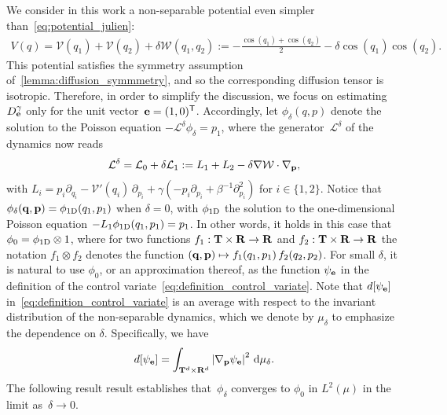 \documentclass[11pt,a4paper]{article}
\begin{document}
We consider in this work a non-separable potential even simpler than~\eqref{eq:potential_julien}:
\begin{align}
    \label{eq:potential_simple}
    V(q) =  \mathcal V(q_1) + \mathcal V(q_2) + \delta \mathcal W(q_1, q_2) := - \frac{\cos(q_1) + \cos(q_2)}{2} - \delta \cos(q_1) \cos(q_2).
\end{align}
This potential satisfies the symmetry assumption of~\cref{lemma:diffusion_symmmetry},
and so the corresponding diffusion tensor is isotropic.
Therefore, in order to simplify the discussion,
we focus on estimating~$D^{\gamma}_{\boldsymbol{\mathbf e}}$ only for the unit vector~$\boldsymbol{\mathbf e} = (1, 0)^\mathsf T$.
Accordingly, let $\phi_\delta(q, p)$ denote the solution to the Poisson equation $- \mathcal L^{\delta} \phi_\delta = p_1$,
where the generator~$\mathcal L^{\delta}$ of the dynamics now reads
\begin{align}
    \label{eq:generator}
    \mathcal L^{\delta} = \mathcal L_0 + \delta \mathcal L_1
    := L_1 + L_2
    - \delta \nabla \mathcal W \cdot \nabla_{\boldsymbol{\mathbf p}},
\end{align}
with $L_i = p_i \partial_{q_i} - \mathcal V'(q_i) \, \partial_{p_i} + \gamma \left(- p_i \partial_{p_i} + \beta^{-1} \partial^2_{p_i} \right)$
for $i \in \{1, 2\}$.
Notice that $\phi_\delta(\boldsymbol{\mathbf q}, \boldsymbol{\mathbf p}) = \phi_{\rm 1D}(q_1, p_1)$ when $\delta = 0$,
with $\phi_{\rm 1D}$ the solution to the one-dimensional Poisson equation $-L_1 \phi_{\rm 1D}(q_1, p_1) = p_1$.
In other words, it holds in this case that $\phi_0 = \phi_{\rm 1D} \otimes 1$,
where for two functions $f_1: \mathbf T \times \mathbf R \rightarrow \mathbf R$ and $f_2: \mathbf T \times \mathbf R \rightarrow \mathbf R$
the notation $f_1 \otimes f_2$ denotes the function $(\boldsymbol{\mathbf q}, \boldsymbol{\mathbf p}) \mapsto f_1(q_1,p_1) \, f_2(q_2,p_2)$.
For small $\delta$, it is natural to use $\phi_0$, or an approximation thereof,
as the function $\psi_{\boldsymbol{\mathbf e}}$ in the definition of the control variate~\eqref{eq:definition_control_variate}.
Note that $d[\psi_{\boldsymbol{\mathbf e}}]$ in~\eqref{eq:definition_control_variate} is an average with respect to the invariant distribution of the non-separable dynamics,
which we denote by $\mu_{\delta}$ to emphasize the dependence on $\delta$.
Specifically, we have
\begin{equation}
    \label{eq:effective_diffusion_d}
    d[\psi_{\vect e}]
    = \int_{\torus^d \times \real^d} \abs{\grad_{\vect p} \psi_{\vect e}}^2 \, \d \mu_{\delta}.
\end{equation}
The following result result establishes that~$\phi_\delta$ converges to $\phi_0$ in $L^2(\mu)$ in the limit as~$\delta \to 0$.
\end{document}

